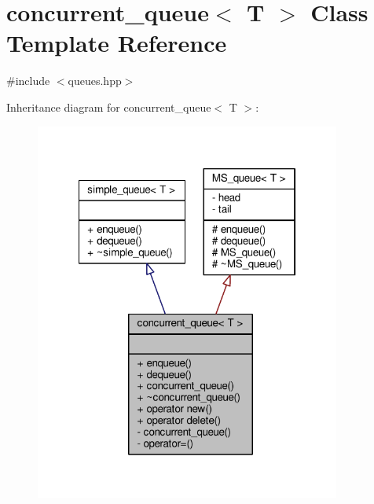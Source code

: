 \hypertarget{classconcurrent__queue}{\section{concurrent\-\_\-queue$<$ T $>$ Class Template Reference}
\label{classconcurrent__queue}
}


{\ttfamily \#include $<$queues.\-hpp$>$}



Inheritance diagram for concurrent\-\_\-queue$<$ T $>$\-:
\nopagebreak
\begin{figure}[H]
\begin{center}
\leavevmode
\includegraphics[width=285pt]{classconcurrent__queue__inherit__graph}
\end{center}
\end{figure}


